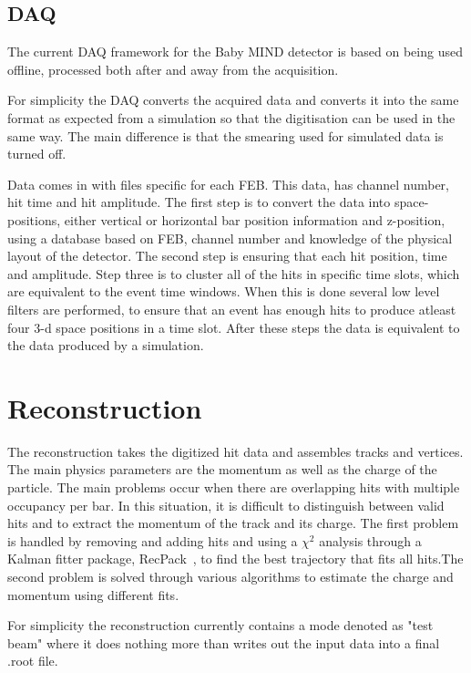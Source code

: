 \subsection{DAQ}

The current DAQ framework for the Baby MIND detector is based on being used offline, processed both after and away from the acquisition.

For simplicity the DAQ converts the acquired data and converts it into the same format as expected from a simulation so that the digitisation can be used in the same way. The main difference is that the smearing used for simulated data is turned off. 

Data comes in with files specific for each FEB. This data, has channel number, hit time and hit amplitude. The first step is to convert the data into space-positions, either vertical or horizontal bar position information and z-position, using a database based on FEB, channel number and knowledge of the physical layout of the detector. The second step is ensuring that each hit position, time and amplitude. Step three is to cluster all of the hits in specific time slots, which are equivalent to the event time windows. When this is done several low level filters are performed, to ensure that an event has enough hits to produce atleast four 3-d space positions in a time slot. After these steps the data is equivalent to the data produced by a simulation.

\pagebreak
\section{Reconstruction}\label{sec:reconstruction}
The reconstruction takes the digitized hit data and assembles tracks and vertices. The main physics parameters are the momentum as well as the charge of the particle. The main problems occur when there are overlapping hits with multiple occupancy per bar. In this situation, it is difficult to distinguish between valid hits and to extract the momentum of the track and its charge.
The first problem is handled by removing and adding hits and using a $\chi^2$ analysis through a Kalman fitter package, RecPack~\cite{RecPack}, to find the best trajectory that fits all hits.The second problem is solved through various algorithms to estimate the charge and momentum using different fits.

For simplicity the reconstruction currently contains a mode denoted as "test beam" where it does nothing more than writes out the input data into a final .root file.

